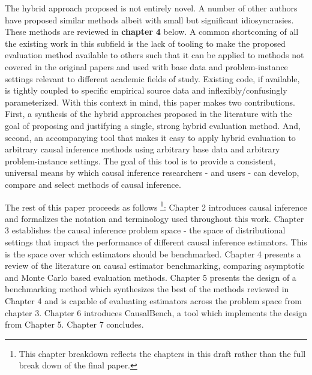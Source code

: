 \documentclass[../main.tex]{subfiles}
\begin{document}
\vspace{\baselineskip}
The hybrid approach proposed is not entirely novel. A number of other authors have proposed similar methods albeit with small but significant idiosyncrasies. These methods are reviewed in \textbf{chapter }\textbf{4} below. A common shortcoming of all the existing work in this subfield is the lack of tooling to make the proposed evaluation method available to others such that it can be applied to methods not covered in the original papers and used with base data and problem-instance settings relevant to different academic fields of study. Existing code, if available, is tightly coupled to specific empirical source data and inflexibly/confusingly parameterized. With this context in mind, this paper makes two contributions. First, a synthesis of the hybrid approaches proposed in the literature with the goal of proposing and justifying a single, strong hybrid evaluation method. And, second, an accompanying tool that makes it easy to apply hybrid evaluation to arbitrary causal inference methods using arbitrary base data and arbitrary problem-instance settings. The goal of this tool is to provide a consistent, universal means by which causal inference researchers - and users - can develop, compare and select methods of causal inference.\par


\vspace{\baselineskip}
The rest of this paper proceeds as follows \footnote{This chapter breakdown reflects the chapters in this draft rather than the full break down of the final paper.}: Chapter 2 introduces causal inference and formalizes the notation and terminology used throughout this work. Chapter 3 establishes the causal inference problem space - the space of distributional settings that impact the performance of different causal inference estimators. This is the space over which estimators should be benchmarked. Chapter 4 presents a review of the literature on causal estimator benchmarking, comparing asymptotic and Monte Carlo based evaluation methods. Chapter 5 presents the design of a benchmarking method which synthesizes the best of the methods reviewed in Chapter 4 and is capable of evaluating estimators across the problem space from chapter 3. Chapter 6 introduces CausalBench, a tool which implements the design from Chapter 5. Chapter 7 concludes.\par
\end{document}
